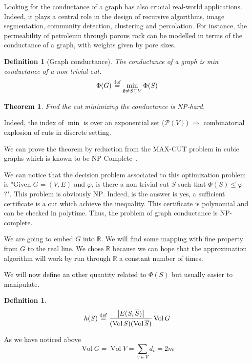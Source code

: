 \documentclass[12pt]{article}
\newtheorem{theorem}[lemma]{Theorem}
\newtheorem{definition}[lemma]{Definition}
\newcommand{\defeq}{\stackrel{{\rm def}}{=}}
\newcommand{\RR}{\mathbb{R}}
\newcommand{\Ra}{\Rightarrow}
\newcommand{\card}[1]{\left\lvert#1\right\rvert}
\newcommand{\NP}{\textsc{NP}}
\DeclareMathOperator{\vol}{Vol}
\begin{document}
Looking for the conductance of a graph has also crucial real-world applications. Indeed, it plays a central role in the design of recursive algorithms, image segmentation, community detection, clustering and percolation. For instance, the permeability of petroleum through porous rock can be modelled in terms of the conductance of a graph, with weights given by pore sizes.

\begin{definition}[Graph conductance]
    The conductance of a graph is min conductance of a non trivial cut.
    \[
        \Phi(G) \defeq \min\limits_{\emptyset \neq S \subsetneq V} \Phi(S)
    \]
\end{definition}

\begin{theorem}
    Find the cut minimizing the conductance is \NP-hard.
\end{theorem}

Indeed, the index of $\min$ is over an exponential set ($\mathcal{P}(V)$) $\Ra$ combinatorial explosion of cuts in discrete setting.

We can prove the theorem by reduction from the MAX-CUT problem in cubic graphs which is known to be \NP-Complete~\cite{yannakakis1978node}.

We can notice that the decision problem associated to this optimization problem is "Given $G=(V,E)$ and $\varphi$, is there a non trivial cut $S$ such that $\Phi(S) \leqslant \varphi$?". This problem is obviously \NP. Indeed, is the answer is yes, a sufficient certificate is a cut which achieve the inequality. This certificate is polynomial and can be checked in polytime. Thus, the problem of graph conductance is \NP-complete.

\bigskip

We are going to embed $G$ into $\RR$. We will find some mapping with fine property from $G$ to the real line. We chose $\RR$ because we can hope that the approximation algorithm will work by run through $\RR$ a constant number of times.

We will now define an other quantity related to $\Phi(S)$ but usually easier to manipulate.

\begin{definition}
    \[
        h(S) \defeq \frac{\card{E(S,\overline{S})}}{(\vol S)(\vol \overline{S})} \vol G
    \]
\end{definition}

As we have noticed above
\[
    \vol G = \vol V = \sum\limits_{v\in V} d_v = 2m
\]
\end{document}
